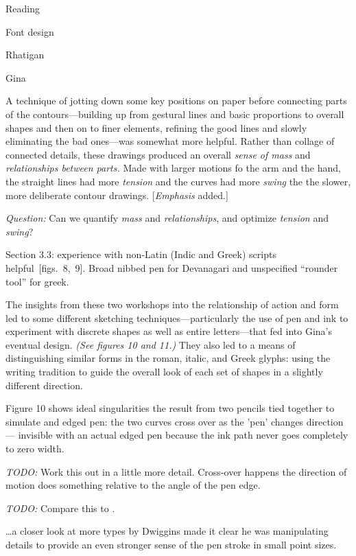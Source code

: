 \documentclass[12pt]{PalisadesLakesBook}
\begin{document}
\begin{plSection}{Reading}
\begin{plSection}{Font design}
\begin{plSection}{Rhatigan}
\begin{plSection}{Gina}
\begin{plSection}{}
\begin{plQuote}{}{}
A technique of jotting down some key positions on paper
before connecting parts of the contours---building up from gestural
lines and basic proportions to overall shapes 
and then on to finer elements, 
refining the good lines and slowly eliminating the bad ones---was
somewhat more helpful.
Rather than collage of connected details,
these drawings produced an overall \emph{sense of mass} 
and \emph{relationships between parts.}
Made with larger motions fo the arm and the hand,
the straight lines had more \emph{tension}
and the curves had more \emph{swing} 
the the slower, more deliberate contour drawings.
[\emph{Emphasis} added.]
\end{plQuote}

\emph{Question:}
Can we quantify \emph{mass} and \emph{relationships},
and optimize \emph{tension} and \emph{swing}?

Section 3.3: experience with non-Latin (Indic and Greek) 
scripts helpful~[figs.~8,~9]. Broad nibbed pen for Devanagari
and unspecified ``rounder tool'' for greek.

\begin{plQuote}{}{}
The insights from these two workshops into the relationship
of action and form led to some different sketching
techniques---particularly the use of pen and ink 
to experiment with discrete shapes as well as entire 
letters---that fed into Gina's eventual design.
\textit{(See figures 10 and 11.)}
They also led to a means of distinguishing similar forms
in the roman, italic, and Greek glyphs:
using the writing tradition to guide the overall look
of each set of shapes in a slightly different direction.
\end{plQuote}

Figure 10 shows ideal singularities the result from two pencils
tied together to simulate and edged pen: the two curves cross over
as the 'pen' changes direction --- invisible 
with an actual edged pen because the ink path never goes 
completely to zero width.

\emph{TODO:} Work this out in a little more detail. Cross-over
happens the direction of motion does something relative
to the angle of the pen edge.

\emph{TODO:} 
Compare this to .

\begin{plQuote}{}{}
\ldots a closer look at more types 
by Dwiggins made it clear he was manipulating details to provide 
an even stronger sense of the pen stroke in small point sizes.
\end{plQuote}


\end{plSection}
\end{plSection}
\end{plSection}
\end{plSection}
\end{plSection}
\end{document}
